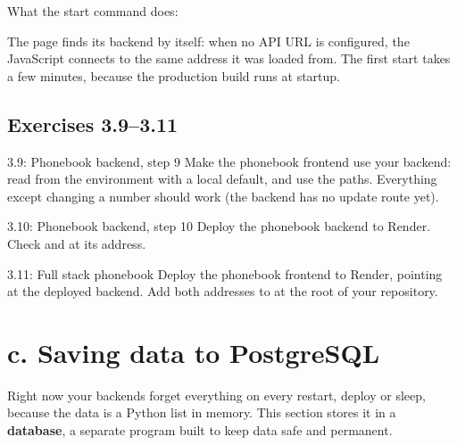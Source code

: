 What the start command does:

The page finds its backend by itself: when no API URL is configured, the JavaScript connects to the same address it was loaded from. The first start takes a few minutes, because the production build runs at startup.

\subsection{Exercises 3.9--3.11}

\begin{exercise}{3.9: Phonebook backend, step 9}
Make the phonebook frontend use your backend: read  from the environment with a local default, and use the  paths. Everything except changing a number should work (the backend has no update route yet).
\end{exercise}

\begin{exercise}{3.10: Phonebook backend, step 10}
Deploy the phonebook backend to Render. Check  and  at its address.
\end{exercise}

\begin{exercise}{3.11: Full stack phonebook}
Deploy the phonebook frontend to Render, pointing at the deployed backend. Add both addresses to  at the root of your repository.
\end{exercise}

\section{c. Saving data to PostgreSQL}

Right now your backends forget everything on every restart, deploy or sleep, because the data is a Python list in memory. This section stores it in a \textbf{database}, a separate program built to keep data safe and permanent.

